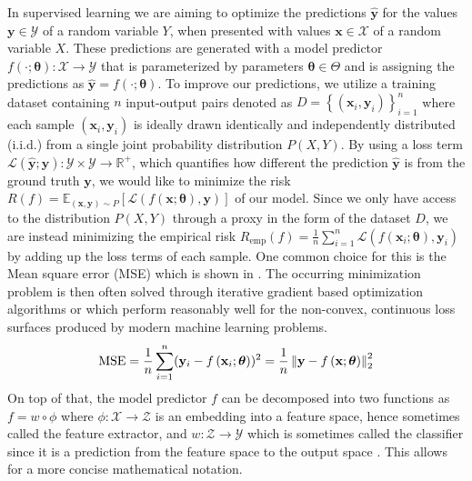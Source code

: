 In supervised learning we are aiming to optimize the predictions $\mathbf{\hat{y}}$ for the values $\mathbf{y} \in \mathcal{Y}$ of a random variable $Y$, when presented with values $\mathbf{x} \in \mathcal{X}$ of a random variable $X$. These predictions are generated with a model predictor $f(\cdot;\boldsymbol{\theta}): \mathcal{X} \rightarrow \mathcal{Y}$ that is parameterized by parameters $\boldsymbol{\theta} \in \Theta$  and is assigning the predictions as $\mathbf{\hat{y}}=f(\cdot;\boldsymbol{\theta})$. To improve our predictions, we utilize a training dataset containing $n$ input-output pairs denoted as $D=\left\{\left(\mathbf{x}_{i}, \mathbf{y}_{i}\right)\right\}_{i=1}^{n}$ where each sample $(\mathbf{x}_i,\mathbf{y}_i)$ is ideally drawn identically and independently distributed (i.i.d.) from a single joint probability distribution $P(X,Y)$. By using a loss term $\mathcal{L} (\mathbf{\hat{y}};\mathbf{y}): \mathcal{Y} \times \mathcal{Y} \rightarrow \mathbb{R}^{+}$, which quantifies how different the prediction $\mathbf{\hat{y}}$ is from the ground truth $\mathbf{y}$, we would like to minimize the risk $R(f) = \mathbb{E}_{(\mathbf{x}, \mathbf{y}) \sim P}[\mathcal{L}(f(\mathbf{x}; \boldsymbol{\theta}), \mathbf{y})]$ of our model. Since we only have access to the distribution $P(X,Y)$ through a proxy in the form of the dataset $D$, we are instead minimizing the empirical risk $R_{\mathrm{emp}}(f)=\frac{1}{n} \sum_{i=1}^n \mathcal{L}\left(f\left(\mathbf{x}_{i};\boldsymbol{\theta}\right), \mathbf{y}_{i}\right)$ by adding up the loss terms of each sample. One common choice for this is the Mean square error (MSE) which is shown in . The occurring minimization problem is then often solved through iterative gradient based optimization algorithms \eg \sgd{} \citep{Robbins1951} or \adam \citep{Kingma2015} which perform reasonably well for the non-convex, continuous loss surfaces produced by modern machine learning problems.
\begin{equation}
\label{eq:mse}
    \text{MSE}=\frac{1}{n} \sum_{i=1}^n (\mathbf{y}_i-f\left(\mathbf{x}_{i};\boldsymbol{\theta}\right))^{2} = \frac{1}{n}\left\lVert \mathbf{y}-f\left(\mathbf{x};\boldsymbol{\theta}\right)\right\rVert_2^2
\end{equation}
On top of that, the model predictor $f$ can be decomposed into two functions as $f=w \circ \phi$ where $\phi: \mathcal{X} \rightarrow \mathcal{Z}$ is an embedding into a feature space, hence sometimes called the feature extractor, and $w: \mathcal{Z} \rightarrow \mathcal{Y}$ which is sometimes called the classifier since it is a prediction from the feature space to the output space \citep{gulrajani2020search, MotiianPAD17}. This allows for a more concise mathematical notation.

